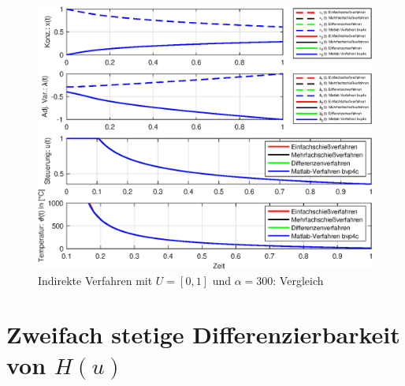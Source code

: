 \begin{figure}[h!]
	\centering
	\includegraphics[width=1\textwidth]{images/CompareIndirect_Method_U1}
	\caption{Indirekte Verfahren mit $U=[0,1]$ und $\alpha = 300$: Vergleich}
	\label{fig:CompareBound_U1}
\end{figure}

\chapter{Zweifach stetige Differenzierbarkeit von \boldmath$H(u)$}\label{chap:A2}
